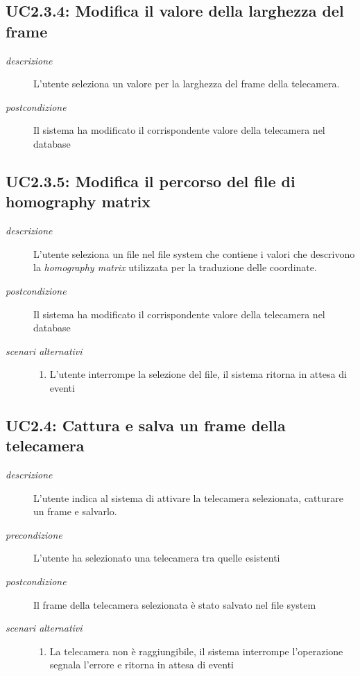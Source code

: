\subsection{UC2.3.4: Modifica il valore della larghezza del frame} \label{sec:UC2.3.4}
\begin{description}
\item[\em{descrizione }]L'utente seleziona un valore per la larghezza del frame della telecamera.
\item[\em{postcondizione }] Il sistema ha modificato il corrispondente valore della telecamera nel database
\end{description}

\subsection{UC2.3.5: Modifica il percorso del file di homography matrix} \label{sec:UC2.3.5}
\begin{description}
\item[\em{descrizione }]L'utente seleziona un file nel file system che contiene i valori che descrivono la \textit{homography matrix} utilizzata per la traduzione delle coordinate.
\item[\em{postcondizione }] Il sistema ha modificato il corrispondente valore della telecamera nel database
\item[\em{scenari alternativi }] \mbox{} 
\begin{enumerate} 
\item L'utente interrompe la selezione del file, il sistema ritorna in attesa di eventi
\end{enumerate}
\end{description}

\subsection{UC2.4: Cattura e salva un frame della telecamera} \label{sec:UC2.4}
\begin{description}
\item[\em{descrizione }]L'utente indica al sistema di attivare la telecamera selezionata, catturare un frame e salvarlo.
\item[\em{precondizione }] L'utente ha selezionato una telecamera tra quelle esistenti
\item[\em{postcondizione }] Il frame della telecamera selezionata è stato salvato nel file system
\item[\em{scenari alternativi }] \mbox{} 
\begin{enumerate} 
\item La telecamera non è raggiungibile, il sistema interrompe l'operazione segnala l'errore e ritorna in attesa di eventi
\end{enumerate}
\end{description}

